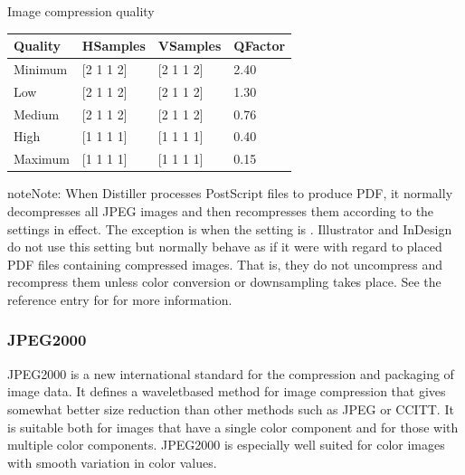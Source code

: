 \documentclass[letterpaper,12pt,english,openany,oneside]{sphinxmanual}
\begin{document}
Image compression quality


\begin{savenotes}\sphinxattablestart
\centering
\begin{tabulary}{\linewidth}[t]{|T|T|T|T|}
\hline
\sphinxstyletheadfamily 
Quality
&\sphinxstyletheadfamily 
HSamples
&\sphinxstyletheadfamily 
VSamples
&\sphinxstyletheadfamily 
QFactor
\\
\hline
Minimum
&
{[}2 1 1 2{]}
&
{[}2 1 1 2{]}
&
2.40
\\
\hline
Low
&
{[}2 1 1 2{]}
&
{[}2 1 1 2{]}
&
1.30
\\
\hline
Medium
&
{[}2 1 1 2{]}
&
{[}2 1 1 2{]}
&
0.76
\\
\hline
High
&
{[}1 1 1 1{]}
&
{[}1 1 1 1{]}
&
0.40
\\
\hline
Maximum
&
{[}1 1 1 1{]}
&
{[}1 1 1 1{]}
&
0.15
\\
\hline
\end{tabulary}
\par
\sphinxattableend\end{savenotes}

\begin{sphinxadmonition}{note}{Note:}
When Distiller processes PostScript files to produce PDF, it normally decompresses all JPEG images and then recompresses them according to the settings in effect. The exception is when the  setting is  . Illustrator and InDesign do not use this setting but normally behave as if it were  with regard to placed PDF files containing compressed images. That is, they do not uncompress and recompress them unless color conversion or downsampling takes place. See the reference entry for  for more information.
\end{sphinxadmonition}




\subsubsection{JPEG2000}
\label{\detokenize{PDF_Create_UsingSettings:jpeg2000}}
JPEG2000 is a new international standard for the compression and packaging of image data. It defines a wavelet\sphinxhyphen{}based method for image compression that gives somewhat better size reduction than other methods such as JPEG or CCITT. It is suitable both for images that have a single color component and for those with multiple color components. JPEG2000 is especially well suited for color images with smooth variation in color values.
\end{document}
